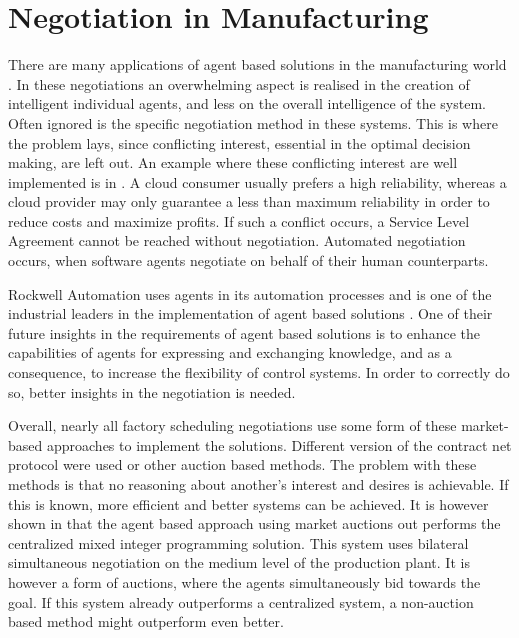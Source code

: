 \section{Negotiation in Manufacturing}
There are many applications of agent based solutions in the manufacturing world \citep{monostori2006agent}. In these negotiations an overwhelming aspect is realised in the creation of intelligent individual agents, and less on the overall intelligence of the system. Often ignored is the specific negotiation method in these systems. This is where the problem lays, since conflicting interest, essential in the optimal decision making, are left out. An example where these conflicting interest are well implemented is in \citet{zheng2014cloud}. A cloud consumer usually prefers a high reliability, whereas a cloud provider may only guarantee a less than maximum reliability in order to reduce costs and maximize profits. If such a conflict occurs, a Service Level Agreement cannot be reached without negotiation. Automated negotiation occurs, when software agents negotiate on behalf of their human counterparts.  


Rockwell Automation uses agents in its automation processes and is one of the industrial leaders in the implementation of agent based solutions \citep{vrba2011rockwell}. One of their future insights in the requirements of agent based solutions is to enhance the capabilities of agents for expressing and exchanging knowledge, and as a consequence, to increase the flexibility of control systems. In order to correctly do so, better insights in the negotiation is needed.

Overall, nearly all factory scheduling negotiations use some form of these market-based approaches \citep{monostori2006agent} to implement the solutions. Different version of the contract net protocol were used or other auction based methods. The problem with these methods is that no reasoning about another's interest and desires is achievable. If this is known, more efficient and better systems can be achieved. It is however shown in \citep{bruccoleri2005production} that the agent based approach using market auctions out performs the centralized mixed integer programming solution. This system uses bilateral simultaneous negotiation on the medium level of the production plant. It is however a form of auctions, where the agents simultaneously bid towards the goal. If this system already outperforms a centralized system, a non-auction based method might outperform even better.

